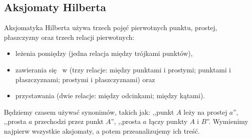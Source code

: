 
\subsection{Aksjomaty Hilberta}
{\color{red}
Aksjomatyka Hilberta używa trzech pojęć pierwotnych punktu, prostej, płaszczyzny oraz trzech relacji pierwotnych:
\begin{itemize}
	\item leżenia pomiędzy (jedna relacja między trójkami punktów),
	\item zawierania się  w (trzy relacje: między punktami i prostymi; punktami i płaszczyznami; prostymi i płaszczyznami) oraz
	\item przystawania (dwie relacje: między odcinkami; między kątami).
\end{itemize}
Będziemy czasem używać synonimów, takich jak: ,,punkt $A$ leży na prostej $a$'', ,,prosta $a$ przechodzi przez punkt $A$'', ,,prosta $a$ łączy punkty $A$ i $B$''.
Wymienimy najpierw wszystkie aksjomaty, a potem przeanalizujemy ich treść.

}
